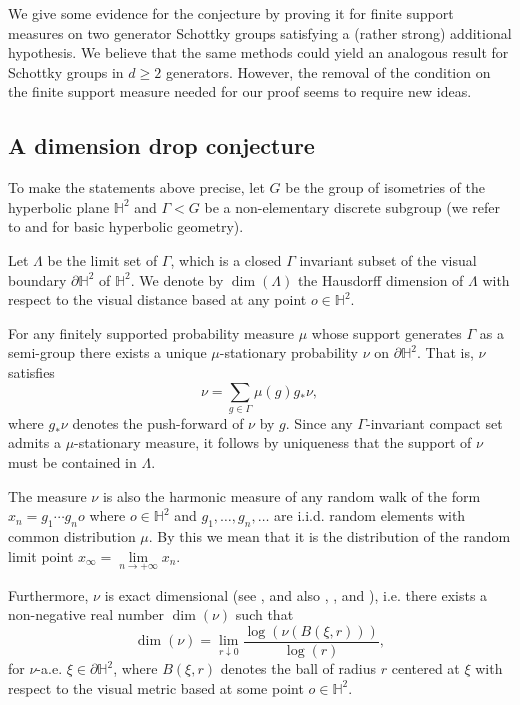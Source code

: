 \documentclass{article}
\renewcommand{\H}{\mathbb{H}}
\begin{document}
We give some evidence for the conjecture by proving it for finite support measures on two generator Schottky groups satisfying a (rather strong) additional hypothesis.   We believe that the same methods could yield an analogous result for Schottky groups in \(d \ge 2\) generators.  However, the removal of the condition on the finite support measure needed for our proof seems to require new ideas.

 \subsection{A dimension drop conjecture}
 
To make the statements above precise, let \(G\) be the group of isometries of the hyperbolic plane \(\H^2\) and \(\Gamma < G\) be a non-elementary discrete subgroup (we refer to \cite{anderson} and \cite{dalbo} for basic hyperbolic geometry).

Let \(\Lambda\) be the limit set of \(\Gamma\), which is a closed \(\Gamma\) invariant subset of the visual boundary \(\partial \H^2\) of \(\H^2\).   We denote by \(\dim(\Lambda)\) the Hausdorff dimension of \(\Lambda\) with respect to the visual distance based at any point \(o \in \H^2\).

For any finitely supported probability measure \(\mu\) whose support generates \(\Gamma\) as a semi-group there exists a unique \(\mu\)-stationary probability \(\nu\) on \(\partial \H^2\).  That is, \(\nu\) satisfies
\[\nu = \sum\limits_{g \in \Gamma}\mu(g)g_*\nu,\]
where \(g_*\nu\) denotes the push-forward of \(\nu\) by \(g\).   Since any \(\Gamma\)-invariant compact set admits a \(\mu\)-stationary measure, it follows by uniqueness that the support of \(\nu\) must be contained in \(\Lambda\).

The measure \(\nu\) is also the harmonic measure of any random walk of the form \(x_n = g_1\cdots g_n o\) where \(o \in \H^2\) and \(g_1,\ldots, g_n,\ldots\) are i.i.d. random elements with common distribution \(\mu\).  By this we mean that it is the distribution of the random limit point \(x_\infty = \lim\limits_{n \to +\infty} x_n\).

Furthermore, \(\nu\) is exact dimensional (see \cite{tanaka}, and also \cite{leprince}, \cite{hochman-solomyak}, and \cite{ledrappier-dimension}), i.e. there exists a non-negative real number \(\dim(\nu)\) such that
\[\dim(\nu) = \lim\limits_{r \downarrow 0}\frac{\log (\nu(B(\xi,r)))}{\log(r)},\]
for \(\nu\)-a.e. \(\xi \in \partial\H^2\), where \(B(\xi,r)\) denotes the ball of radius \(r\) centered at \(\xi\) with respect to the visual metric based at some point \(o \in \H^2\).  
\end{document}
